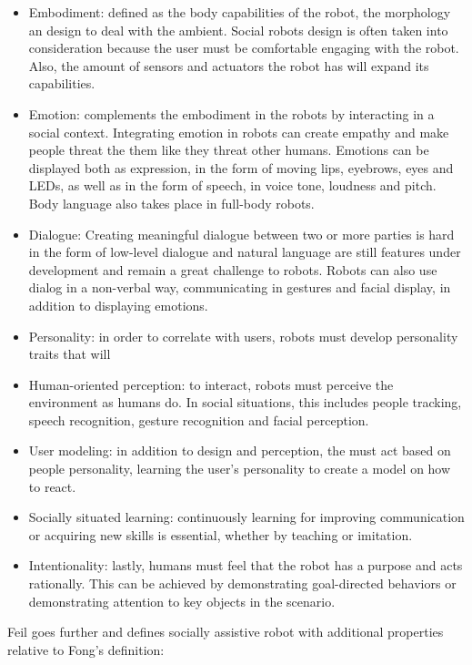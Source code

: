 \begin{itemize}
    \item Embodiment: defined as the body capabilities of the robot, the morphology an design to deal with the ambient. Social robots design is often taken into consideration because the user must be comfortable engaging with the robot. Also, the amount of sensors and actuators the robot has will expand its capabilities.
    \item Emotion: complements the embodiment in the robots by interacting in a social context. Integrating emotion in robots can create empathy and make people threat the them like they threat other humans. Emotions can be displayed both as expression, in the form of moving lips, eyebrows, eyes and LEDs, as well as in the form of speech, in voice tone, loudness and pitch. Body language also takes place in full-body robots.
    \item Dialogue: Creating meaningful dialogue between two or more parties is hard in the form of low-level dialogue and natural language are still features under development and remain a great challenge to robots. Robots can also use dialog in a non-verbal way, communicating in gestures and facial display, in addition to displaying emotions.
    \item Personality: in order to correlate with users, robots must develop personality traits that will 
    \item Human-oriented perception: to interact, robots must perceive the environment as humans do. In social situations, this includes people tracking, speech recognition, gesture recognition and facial perception.
    \item User modeling: in addition to design and perception, the must act based on people personality, learning the user's personality to create a model on how to react.
    \item Socially situated learning: continuously learning for improving communication or acquiring new skills is essential, whether by teaching or imitation.
    \item Intentionality: lastly, humans must feel that the robot has a purpose and acts rationally. This can be achieved by demonstrating goal-directed behaviors or demonstrating attention to key objects in the scenario.
\end{itemize}

Feil goes further and defines socially assistive robot with additional properties relative to Fong's definition:

